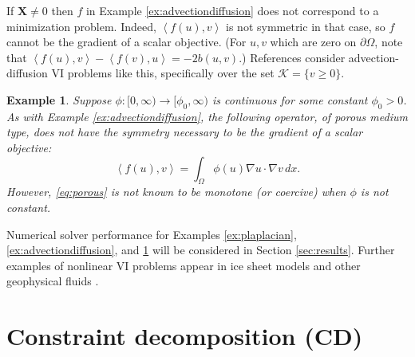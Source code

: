 \documentclass[letterpaper,final,12pt,reqno]{amsart}
\theoremstyle{cstyle}
\theoremstyle{cstyle*}
\theoremstyle{dstyle}
\newtheorem{example}[theorem]{Example}
\numberwithin{equation}{section}
\numberwithin{figure}{section}
\numberwithin{table}{section}
\numberwithin{theorem}{section}
\newcommand{\grad}{\nabla}
\newcommand{\bX}{\mathbf{X}}
\newcommand{\cK}{\mathcal{K}}
\newcommand{\ip}[2]{\left<#1,#2\right>}
\begin{document}
If $\bX \ne 0$ then $f$ in Example \ref{ex:advectiondiffusion} does not correspond to a minimization problem.  Indeed, $\ip{f(u)}{v}$ is not symmetric in that case, so $f$ cannot be the gradient of a scalar objective.  (For $u,v$ which are zero on $\partial \Omega$, note that $\ip{f(u)}{v} - \ip{f(v)}{u} = -2 b(u,v)$.)  References \cite{Bueler2021conservation,ChangNakshatrala2017} consider advection-diffusion VI problems like this, specifically over the set $\cK = \{v\ge 0\}$.

\begin{example}  \label{ex:porous}  Suppose $\phi:[0,\infty) \to [\phi_0,\infty)$ is continuous for some constant $\phi_0>0$.  As with Example \ref{ex:advectiondiffusion}, the following operator, of porous medium type, does not have the symmetry necessary to be the gradient of a scalar objective:
\begin{equation}
\ip{f(u)}{v} = \int_\Omega \phi(u) \grad u \cdot \grad v\,dx. \label{eq:porous}
\end{equation}
However, \eqref{eq:porous} is not known to be monotone (or coercive) when $\phi$ is not constant.
\end{example}

Numerical solver performance for Examples \ref{ex:plaplacian}, \ref{ex:advectiondiffusion}, and \ref{ex:porous} will be considered in Section \ref{sec:results}.  Further examples of nonlinear VI problems appear in ice sheet models \cite{Calvoetal2002,JouvetBueler2012} and other geophysical fluids \cite{Bueler2021conservation}.


\section{Constraint decomposition (CD)} \label{sec:cd}
\end{document}
